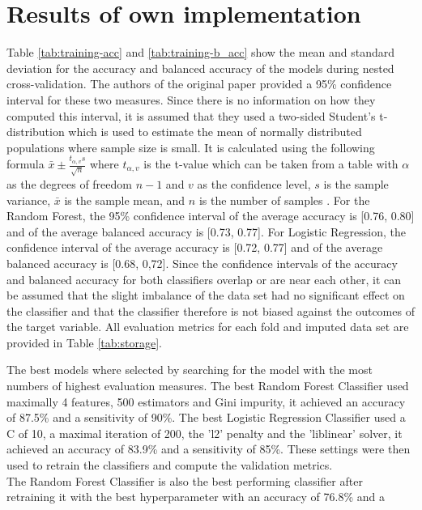 \section{Results of own implementation}
Table \ref{tab:training-acc} and \ref{tab:training-b_acc} show the mean and 
standard deviation for the accuracy and balanced accuracy of the models during 
nested cross-validation. The authors of the original paper provided a 95\% 
confidence interval for these two measures. Since there is no information on 
how they computed this interval, it is assumed that they used a two-sided 
Student's t-distribution which is used to estimate the mean of normally 
distributed populations where sample size is small. It is calculated using the 
following formula $\bar{x} \pm \frac{t_{\alpha, v}s}{\sqrt{n}}$ where 
$t_{\alpha, v}$ is the t-value which can be taken from a table with $\alpha$ 
as the degrees of freedom $n-1$ and $v$ as the confidence level, $s$ is the 
sample variance, $\bar{x}$ is the sample mean, and $n$ is the number of samples 
\cite{RN197}.
For the Random Forest, the 95\% confidence interval of the average accuracy is 
[0.76, 0.80] and of the average balanced accuracy is [0.73, 0.77]. For Logistic 
Regression, the confidence interval of the average accuracy is [0.72, 0.77] and 
of the average balanced accuracy is [0.68, 0,72]. Since the confidence 
intervals of the accuracy and balanced accuracy for both classifiers overlap or 
are near each other, it can be assumed that the slight imbalance of the data 
set had no significant effect on the classifier and that the classifier 
therefore 
is not biased against the outcomes of the target variable. All evaluation 
metrics for each fold and imputed data set are provided in Table 
\ref{tab:storage}.
\par
The best models where selected by searching for the model with the most numbers 
of highest evaluation measures. The best Random Forest Classifier used 
maximally 
4 features, 500 estimators and Gini impurity, it achieved an accuracy of 87.5\% 
and a 
sensitivity of 90\%. The best Logistic Regression Classifier used a C of 10, a 
maximal iteration of 200, the 'l2' penalty and the 'liblinear' solver, it 
achieved an accuracy 
of 83.9\% and a sensitivity of 85\%. These settings were then used to retrain 
the classifiers and compute the validation metrics.
\\
The Random Forest Classifier is also the best performing classifier after 
retraining it with the best hyperparameter with an accuracy of 76.8\% and a 
